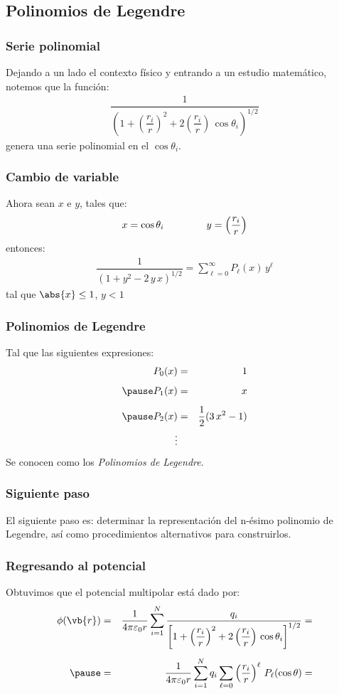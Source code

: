 \subsection{Polinomios de Legendre}
\begin{frame}
\frametitle{Serie polinomial}
Dejando a un lado el contexto físico y entrando a un estudio matemático, notemos que la función:
\begin{align*}
\dfrac{1}{\left( 1 + \left( \dfrac{r_{i}}{r} \right)^{2} + 2 \left( \dfrac{r_{i}}{r} \right) \, \cos \theta_{i} \right)^{1/2}}
\end{align*}
genera una serie polinomial en el $\cos \theta_{i}$.
\end{frame}
\begin{frame}
\frametitle{Cambio de variable}
Ahora sean $x$ e $y$, tales que:
\begin{align*}
x = \cos \theta_{i} \hspace{1.5cm} y = \left( \dfrac{r_{i}}{r} \right)
\end{align*}
entonces:
\pause
\begin{align*}
\dfrac{1}{(1 + y^{2} - 2 \, y \, x)^{1/2}} = \sum_{\ell=0}^{\infty} P_{\ell} (x) \, y^{\ell}
\end{align*}
tal que $\abs{x} \leq 1$, $y < 1$
\end{frame}
\begin{frame}
\frametitle{Polinomios de Legendre}
Tal que las siguientes expresiones:
\begin{eqnarray*}
P_{0} (x) &=& 1 \\[0.5em] \pause
P_{1} (x) &=& x \\[0.5em] \pause
P_{2} (x) &=& \dfrac{1}{2} (3 \, x^{2} - 1) \\
\vdots
\end{eqnarray*}
\pause
Se conocen como los \emph{Polinomios de Legendre}.
\end{frame}
\begin{frame}
\frametitle{Siguiente paso}
El siguiente paso es: determinar la representación del n-ésimo polinomio de Legendre, así como procedimientos alternativos para construirlos.
\end{frame}
\begin{frame}
\frametitle{Regresando al potencial}
Obtuvimos que el potencial multipolar está dado por:
\begin{eqnarray*}
\phi(\vb{r}) &=& \dfrac{1}{4 \pi \varepsilon_{0} r} \sum_{i=1}^{N} \dfrac{q_{i}}{\left[ 1 + \left( \dfrac{r_{i}}{r} \right)^{2} + 2 \left( \dfrac{r_{i}}{r} \right) \, \cos \theta_{i} \right]^{1/2}} = \\[0.5em] \pause
&=& \dfrac{1}{4 \pi \varepsilon_{0} r} \sum_{i=1}^{N} q_{i} \sum_{\ell=0} \left( \dfrac{r_{i}}{r} \right)^{\ell} \, P_{\ell} (\cos \theta) =
\end{eqnarray*}
\end{frame}
